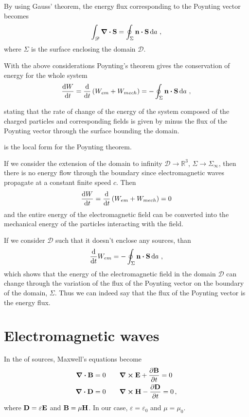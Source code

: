 \documentclass[12pt, class=report, crop=false]{standalone}
\begin{document}
By using Gauss' theorem, the energy flux corresponding to the
Poynting vector becomes
\[
  \int_{\mathscr{D}} \div{\vb{S}} = \oint_\Sigma \vb{n} \vdot \vb{S} \dd{a}\,,
\]
where \(\Sigma\) is the surface enclosing the domain \(\mathscr{D}\).

With the above considerations Poynting's theorem gives the conservation of energy for the whole system
\begin{equation}
  \label{eq:poynting-theorem}
  \dv{W}{t} = \dv{t} \left( W_{em} + W_{mech} \right) =
  -\oint_\Sigma \vb{n} \vdot \vb{S} \dd{a}\,,
\end{equation}

stating that the rate of change of the energy of the system composed of the charged
particles and corresponding fields is given by minus the flux of the
Poynting vector through the surface bounding the domain.

 is the local form for the Poynting
theorem.

If we consider the extension of the domain to infinity \(\mathscr{D} \to \mathbb{R}^3\),
\(\Sigma \to \Sigma_\infty\), then there is no energy flow through the
boundary since electromagnetic waves propagate at a constant finite speed \(c\). Then
\[
  \dv{W}{t} = \dv{t} \left( W_{em} + W_{mech} \right) = 0
\]
and the entire energy of the electromagnetic field can be converted into
the mechanical energy of the particles interacting with the field.

If we consider \(\mathscr{D}\) such that it doesn't enclose any sources, than
\[
  \dv{t} W_{em} = -\oint_\Sigma \vb{n} \vdot \vb{S} \dd{a}\,,
\]
which shows that the energy of the electromagnetic field in the domain
\(\mathscr{D}\) can change through the variation of the flux of the
Poynting vector on the boundary of the domain, \(\Sigma\). Thus we can
indeed say that the flux of the Poynting vector is the energy flux.

\section{Electromagnetic waves}

In the of sources, Maxwell's equations become
\begin{subequations}
  \begin{align*}
    \div{\vb{B}} &= 0  \qquad \curl{\vb{E}} + \pdv{\vb{B}}{t} = 0 \\
    \div{\vb{D}} &= 0  \qquad \curl{\vb{H}} - \pdv{\vb{D}}{t} = 0\,,
  \end{align*}
\end{subequations}
where \(\vb{D} = \varepsilon \vb{E}\) and \(\vb{B} = \mu \vb{H}\).
In our case, \(\varepsilon = \varepsilon_0\) and \(\mu = \mu_0\).
\end{document}
